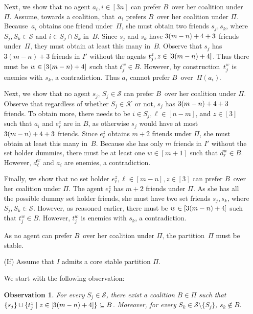 \documentclass[a4paper,fleqn]{cas-sc}
\newcommand{\partition}{\ensuremath{\Pi}\xspace}
\newcommand{\blockingCoalition}{\ensuremath{B}\xspace}
\newcommand{\coalB}{\ensuremath{B}}
\newtheorem{obs}{Observation}
\newcommand{\sets}{\ensuremath{\mathcal{S}}}
\newcommand{\elements}{\ensuremath{[3n]}}
\newcommand{\sset}[1]{\ensuremath{S_{#1}}}
\newcommand{\ecov}{\ensuremath{\mathcal{K}}}
\begin{document}
{Next, we show that no agent $a_i, i \in \elements$ can prefer \blockingCoalition\ over her coalition under \partition.
Assume, towards a coalition, that~$a_i$ prefers \blockingCoalition\ over her coalition under \partition. Because~$a_i$ obtains one friend under~$\partition$, she must obtain two friends $s_j, s_k$, where $\sset j, \sset k \in \sets$ and $i \in \sset j \cap \sset k$ in~\blockingCoalition.
Since $s_j$ and $s_k$ have $3(m -n) + 4 + 3$ friends under~\partition, they must obtain at least this many in~\blockingCoalition.
Observe that $s_j$ has $3(m - n) + 3$ friends in $I'$ without the agents $t^z_j, z \in [3(m -n) + 4]$.
Thus there must be $w \in [3(m -n) + 4]$ such that $t^w_j \in \blockingCoalition$.
However, by construction~$t^w_j$ is enemies with $s_k$, a contradiction.
Thus $a_i$ cannot prefer \blockingCoalition\ over~$\partition(a_i)$.

Next, we show that no agent $s_j$, $\sset j \in \sets$ can prefer \blockingCoalition\ over her coalition under \partition.
Observe that regardless of whether $\sset j \in \ecov$ or not, $s_j$ has $3(m -n) + 4 +3$ friends.
To obtain more, there needs to be $i \in \sset j, \ell \in [n -m]$, and $z \in [3]$ such that $a_i$ and $e^z_\ell$ are in \blockingCoalition, as otherwise $s_j$ would have at most $3(m -n) + 4 + 3$ friends.
Since $e^z_\ell$ obtains $m + 2$ friends under \partition, she must obtain at least this many in~\blockingCoalition.
Because she has only $m$ friends in $I'$ without the set holder dummies, there must be at least one $w \in [m + 1]$ such that $d^w_\ell \in \blockingCoalition$. However, $d^w_\ell$ and $a_i$ are enemies, a contradiction.

Finally, we show that no set holder $e^z_\ell, \ell \in [m -n], z \in [3]$ can prefer \blockingCoalition\ over her coalition under \partition.
The agent $e^z_\ell$ has $m + 2$ friends under \partition.
As she has all the possible dummy set holder friends, she must have two set friends $s_j, s_k$, where $\sset j, \sset k \in \sets$.
However, as reasoned earlier, there must be $w \in [3(m -n) + 4]$ such that $t^w_j \in \blockingCoalition$.
However, $t^w_j$ is enemies with $s_k$, a contradiction.

As no agent can prefer \blockingCoalition\ over her coalition under \partition, the partition~\partition must be stable.

(If) Assume that $I$ admits a core stable partition \partition.

We start with the following observation:
\begin{obs}\label{obs:dummyjob}
For every $\sset j \in \sets$, there exist a coalition $\coalB \in \partition$ such that $\{s_j\} \cup \{t^z_j \mid z \in [3(m -n) + 4]\} \subseteq B$.
Moreover, for every $\sset k \in \sets \setminus \{\sset j\}$, $s_k \notin \coalB$.


\end{obs}}
\end{document}
